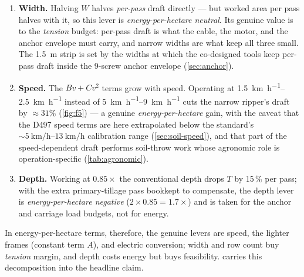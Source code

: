 \documentclass[11pt,a4paper]{article}
\begin{document}
\begin{enumerate}[leftmargin=1.6em,itemsep=0.15em]
    \item \textbf{Width.} Halving $W$ halves \emph{per-pass} draft directly --- but worked area per pass halves with it, so this lever is \emph{energy-per-hectare neutral}. Its genuine value is to the \emph{tension} budget: per-pass draft is what the cable, the motor, and the anchor envelope must carry, and narrow widths are what keep all three small. The \SI{1.5}{\meter} strip is set by the widths at which the co-designed tools keep per-pass draft inside the 9-screw anchor envelope (\cref{sec:anchor}).
    \item \textbf{Speed.} The $B v + C v^{2}$ terms grow with speed. Operating at \SIrange{1.5}{2.5}{\kilo\meter\per\hour} instead of \SIrange{5}{9}{\kilo\meter\per\hour} cuts the narrow ripper's draft by ${\approx}31\%$ (\cref{fig:f5}) --- a genuine \emph{energy-per-hectare} gain, with the caveat that the D497 speed terms are here extrapolated below the standard's ${\sim}\SIrange{5}{13}{\kilo\meter\per\hour}$ calibration range (\cref{sec:soil-speed}), and that part of the speed-dependent draft performs soil-throw work whose agronomic role is operation-specific (\cref{tab:agronomic}).
    \item \textbf{Depth.} Working at $0.85\times$ the conventional depth drops $T$ by 15\,\% per pass; with the extra primary-tillage pass bookkept to compensate, the depth lever is \emph{energy-per-hectare negative} ($2\times0.85=1.7\times$) and is taken for the anchor and carriage load budgets, not for energy.
\end{enumerate}

In energy-per-hectare terms, therefore, the genuine levers are speed, the lighter frames (constant term $A$), and electric conversion; width and row count buy \emph{tension} margin, and depth costs energy but buys feasibility.  carries this decomposition into the headline claim.
\end{document}
